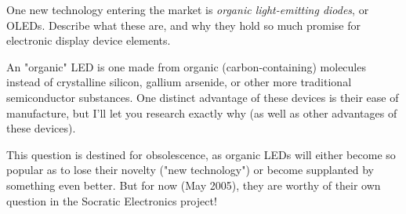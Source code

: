 

One new technology entering the market is {\it organic light-emitting diodes}, or OLEDs.  Describe what these are, and why they hold so much promise for electronic display device elements.







An "organic" LED is one made from organic (carbon-containing) molecules instead of crystalline silicon, gallium arsenide, or other more traditional semiconductor substances.  One distinct advantage of these devices is their ease of manufacture, but I'll let you research exactly why (as well as other advantages of these devices).







This question is destined for obsolescence, as organic LEDs will either become so popular as to lose their novelty ("new technology") or become supplanted by something even better.  But for now (May 2005), they are worthy of their own question in the Socratic Electronics project!




